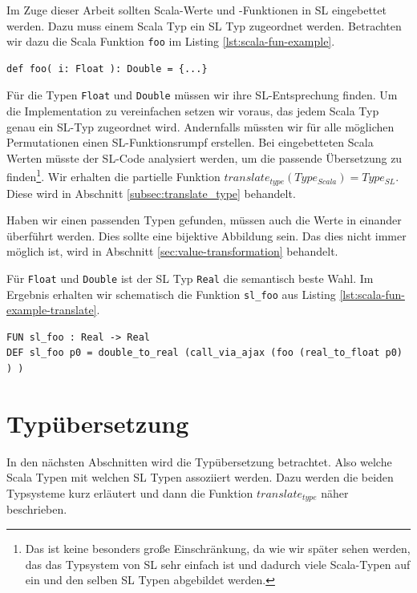 \documentclass[12pt]{scrreprt}
\begin{document}
Im Zuge dieser Arbeit sollten Scala-Werte und -Funktionen in \ac{SL} eingebettet werden. Dazu muss einem Scala Typ ein \ac{SL} Typ zugeordnet werden. Betrachten wir dazu die Scala Funktion \lstinline!foo! im Listing \ref{lst:scala-fun-example}.

\begin{lstlisting}[caption=Beispielfunktion foo, label=lst:scala-fun-example]
def foo( i: Float ): Double = {...}
\end{lstlisting}

Für die Typen \lstinline!Float! und \lstinline!Double! müssen wir ihre \ac{SL}-Entsprechung finden. Um die Implementation zu vereinfachen setzen wir voraus, das jedem Scala Typ genau ein \ac{SL}-Typ zugeordnet wird. Andernfalls müssten wir für alle möglichen Permutationen einen \ac{SL}-Funktionsrumpf erstellen. Bei eingebetteten Scala Werten müsste der SL-Code analysiert werden, um die passende Übersetzung zu finden\footnote{Das ist keine besonders große Einschränkung, da wie wir später sehen werden, das das Typsystem von SL sehr einfach ist und dadurch viele Scala-Typen auf ein und den selben SL Typen abgebildet werden. }. Wir erhalten die partielle Funktion $translate_{type}(Type_{Scala}) = Type_{SL}$. Diese wird in Abschnitt \ref{subsec:translate_type} behandelt.

Haben wir einen passenden Typen gefunden, müssen auch die Werte in einander überführt werden. Dies sollte eine bijektive Abbildung sein. Das dies nicht immer möglich ist, wird in Abschnitt \ref{sec:value-transformation} behandelt.

Für \lstinline!Float! und \lstinline!Double! ist der SL Typ \lstinline!Real! die semantisch beste Wahl. Im Ergebnis erhalten wir schematisch die Funktion \lstinline!sl_foo! aus Listing \ref{lst:scala-fun-example-translate}.

\begin{lstlisting}[caption=Übersetzung von foo, label=lst:scala-fun-example-translate]
FUN sl_foo : Real -> Real
DEF sl_foo p0 = double_to_real (call_via_ajax (foo (real_to_float p0) ) )
\end{lstlisting}

\section{Typübersetzung}
\label{sec:type-translation}

In den nächsten Abschnitten wird die Typübersetzung betrachtet. Also welche Scala Typen mit welchen SL Typen assoziiert werden. Dazu werden die beiden Typsysteme kurz erläutert und dann die Funktion $translate_{type}$ näher beschrieben.
\end{document}

